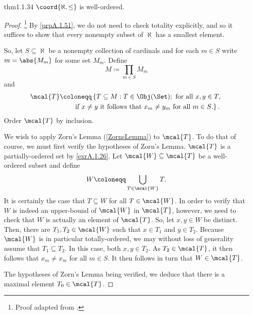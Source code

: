 \begin{thm}{}{thm1.1.34}
$\coord{\aleph ,\leq}$ is well-ordered.
\begin{proof}\footnote{Proof adapted from \cite{Honig}.}
By \cref{prpA.1.51}, we do not need to check totality explicitly, and so it suffices to show that every nonempty subset of $\aleph$ has a smallest element.

So, let $S\subseteq \aleph$ be a nonempty collection of cardinals and for each $m\in S$ write $m=\abs{M_m}$ for some set $M_m$.  Define
\begin{equation}
M\coloneqq \prod _{m\in S}M_m
\end{equation}
and
\begin{equation}\label{1.1.39}
\begin{split}
\mcal{T} & \coloneqq \left\{ T\subseteq M:T\in \Obj (\Set );\text{ for all }x,y\in T,\right. \\ & \qquad \left. \text{if }x\neq y\text{ it follows that }x_m\neq y_m\text{ for all }m\in S\text{.}\right\} .
\end{split}
\end{equation}
Order $\mcal{T}$ by inclusion.

We wish to apply Zorn's Lemma (\cref{ZornsLemma}) to $\mcal{T}$.  To do that of course, we must first verify the hypotheses of Zorn's Lemma.  $\mcal{T}$ is a partially-ordered set by \cref{exrA.1.26}.  Let $\mcal{W}\subseteq \mcal{T}$ be a well-ordered subset and define
\begin{equation}
W\coloneqq \bigcup _{T\in \mcal{W}}T.
\end{equation}
It is certainly the case that $T\subseteq W$ for all $T\in \mcal{W}$.  In order to verify that $W$ is indeed an upper-bound of $\mcal{W}$ in $\mcal{T}$, however, we need to check that $W$ is actually an element of $\mcal{T}$.  So, let $x,y\in W$ be distinct.  Then, there are $T_1,T_2\in \mcal{W}$ such that $x\in T_1$ and $y\in T_2$.  Because $\mcal{W}$ is in particular totally-ordered, we may without loss of generality assume that $T_1\subseteq T_2$.  In this case, both $x,y\in T_2$.  As $T_2\in \mcal{T}$, it then follows that $x_m\neq x_m$ for all $m\in S$.  It then follows in turn that $W\in \mcal{T}$.

The hypotheses of Zorn's Lemma being verified, we deduce that there is a maximal element $T_0\in \mcal{T}$.


\end{proof}
\end{thm}
